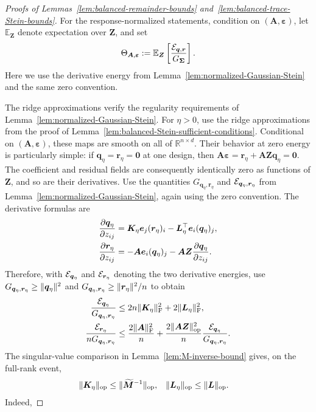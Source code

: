 \documentclass{article}
\theoremstyle{plain}
\theoremstyle{definition}
\theoremstyle{definition}
\newcommand{\boldzero}{\mathbf{0}}
\DeclarePairedDelimiter\norm{\lVert}{\rVert}
\def\R{{\mathbb{R}}}
\def\E{{\mathbb{E}}}
\def\mathbold{\boldsymbol}
\def\cal{\mathcal}
\def\bA{\mathbold{A}}\def\calA{{\cal A}}\def\scrA{{\mathscr A}}\def\Ahat{\widehat{A}}\def\Atil{{\widetilde A}}
\def\bK{\mathbold{K}}\def\hbK{{\widehat{\bK}}}\def\tbK{{\widetilde{\bK}}}
\def\bL{\mathbold{L}}\def\hbL{{\widehat{\bL}}}\def\tbL{{\widetilde{\bL}}}
\def\bM{\mathbold{M}}\def\hbM{{\widehat{\bM}}}\def\tbM{{\widetilde{\bM}}}
\def\bq{\mathbold{q}}\def\qhat{\widehat{q}}\def\qtil{\widetilde{q}}\def\qbar{{\overline q}}
\def\br{\mathbold{r}}\def\rhat{\widehat{r}}\def\rtil{\widetilde{r}}\def\rbar{{\overline r}}
\def\be{\mathbold{e}}
\def\bZ{\mathbold{Z}}\def\hbZ{{\widehat{\bZ}}}\def\tbZ{{\widetilde{\bZ}}}
\def\ep{\varepsilon}\def\eps{\epsilon}\def\veps{\varepsilon}
\def\bep{ {\mathbold{\ep} }}
\def\bSigma{\mathbold{\Sigma}}\def\hbSigma{{\widehat{\bSigma}}}
\begin{document}
\begin{proof}[Proofs of Lemmas~\ref{lem:balanced-remainder-bounds}
and~\ref{lem:balanced-trace-Stein-bounds}]
For the response-normalized statements, condition on
$(\bA,\bep)$, let $\E_{\bZ}$ denote expectation over $\bZ$, and set
\begin{align*}
    \Theta_{\bA,\bep}
    :=\E_{\bZ}\left[\frac{\calE_{\bq,\br}}{G_{\bSigma}}\right].
\end{align*}
Here we use the derivative energy from
Lemma~\ref{lem:normalized-Gaussian-Stein} and the same zero convention.

The ridge approximations verify the regularity requirements of
Lemma~\ref{lem:normalized-Gaussian-Stein}. For $\eta>0$, use the ridge
approximations from the proof of
Lemma~\ref{lem:balanced-Stein-sufficient-conditions}.
Conditional on $(\bA,\bep)$, these maps are smooth on all of
$\R^{n\times d}$. Their behavior at zero energy is particularly simple: if
$\bq_\eta=\br_\eta=\boldzero$ at one design, then
$\bA\bep=\br_\eta+\bA\bZ\bq_\eta=\boldzero$. The coefficient and residual
fields are consequently identically zero as functions of $\bZ$, and so are
their derivatives. Use the quantities
$G_{\bq_\eta,\br_\eta}$ and $\calE_{\bq_\eta,\br_\eta}$ from
Lemma~\ref{lem:normalized-Gaussian-Stein}, again using the zero convention.
The derivative formulas are
\begin{align*}
    \pdv{\bq_\eta}{z_{ij}}
    &=\bK_\eta\be_j(\br_\eta)_i
      -\bL_\eta^\top\be_i(\bq_\eta)_j,\\
    \pdv{\br_\eta}{z_{ij}}
    &=-\bA\be_i(\bq_\eta)_j
      -\bA\bZ\pdv{\bq_\eta}{z_{ij}}.
\end{align*}
Therefore, with $\calE_{\bq_\eta}$ and $\calE_{\br_\eta}$ denoting the two
derivative energies, use
$G_{\bq_\eta,\br_\eta}\geq\norm{\bq_\eta}^2$ and
$G_{\bq_\eta,\br_\eta}\geq\norm{\br_\eta}^2/n$ to obtain
\begin{align*}
    \frac{\calE_{\bq_\eta}}{G_{\bq_\eta,\br_\eta}}
    &\leq 2n\norm{\bK_\eta}_{\rm F}^2
       +2\norm{\bL_\eta}_{\rm F}^2,\\
    \frac{\calE_{\br_\eta}}{nG_{\bq_\eta,\br_\eta}}
    &\leq \frac{2\norm{\bA}_{\rm F}^2}{n}
       +\frac{2\norm{\bA\bZ}_{\rm op}^2}{n}
          \frac{\calE_{\bq_\eta}}{G_{\bq_\eta,\br_\eta}}.
\end{align*}
The singular-value comparison in
Lemma~\ref{lem:M-inverse-bound} gives, on the full-rank event,
\begin{align*}
    \norm{\bK_\eta}_{\rm op}
       &\leq\norm{\widetilde{\bM}^{-1}}_{\rm op},
    &
    \norm{\bL_\eta}_{\rm op}
       &\leq\norm{\bL}_{\rm op}.
\end{align*}
Indeed,

\end{proof}
\end{document}
